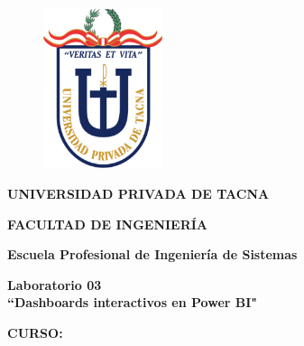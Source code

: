 \documentclass[12pt,letterpaper]{article}
\begin{document}
    \begin{titlepage}
        \begin{center}
            \begin{figure}[htb]
                \begin{center}
                    \includegraphics[width=3.5cm]{./img/logo}
                \end{center}
            \end{figure}
            \vspace*{0.15in}
            \begin{Large}
                \textbf{UNIVERSIDAD PRIVADA DE TACNA}\\
            \end{Large}
            \vspace*{0.15in}
            \begin{Large}
                \textbf{FACULTAD DE INGENIERÍA} \\
            \end{Large}
            \vspace*{0.1in}
            \begin{Large}
                \textbf{Escuela Profesional de Ingeniería de Sistemas} \\
            \end{Large}
            \vspace*{0.3in}
            \begin{Large}
                \textbf{Laboratorio 03}\\
                \textbf{``Dashboards interactivos en Power BI"}\\
            \end{Large}
            \vspace*{0.2in}
            \begin{Large}
                \textbf{CURSO:} \\
            \end{Large}
            \vspace*{0.1in}
            \begin{large}

\end{large}
\end{center}
\end{titlepage}
\end{document}
